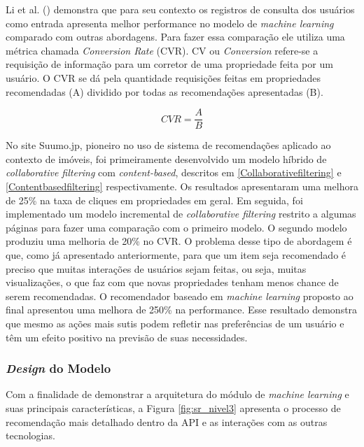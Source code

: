 Li et al. (\citeyear{Summo:2017}) demonstra que para seu contexto os registros de consulta dos usuários como entrada apresenta melhor performance no modelo de \textit{machine learning} comparado com outras abordagens. Para fazer essa comparação ele utiliza uma métrica chamada \textit{Conversion Rate} (CVR). CV ou \textit{Conversion} refere-se a requisição de informação para um corretor de uma propriedade feita por um usuário. O CVR se dá pela quantidade requisições feitas em propriedades recomendadas (A) dividido por todas as recomendações apresentadas (B).

\begin{equation}
    CVR=\frac{A}{B}
\end{equation}

No site Suumo.jp, pioneiro no uso de sistema de recomendações aplicado ao contexto de imóveis, foi primeiramente desenvolvido um modelo híbrido de \textit{collaborative filtering} com \textit{content-based}, descritos em \ref{Collaborativefiltering} e \ref{Contentbasedfiltering} respectivamente. Os resultados apresentaram uma melhora de 25\% na taxa de cliques em propriedades em geral. Em seguida, foi implementado um modelo incremental de \textit{collaborative filtering} restrito a algumas páginas para fazer uma comparação com o primeiro modelo. O segundo modelo produziu uma melhoria de 20\% no CVR. O problema desse tipo de abordagem é que, como já apresentado anteriormente, para que um item seja recomendado é preciso que muitas interações de usuários sejam feitas, ou seja, muitas visualizações, o que faz com que novas propriedades tenham menos chance de serem recomendadas. O recomendador baseado em \textit{machine learning} proposto ao final apresentou uma melhora de 250\% na performance. Esse resultado demonstra que mesmo as ações mais sutis podem refletir nas preferências de um usuário e têm um efeito positivo na previsão de suas necessidades.

\subsubsection{\textit{Design} do Modelo}

Com a finalidade de demonstrar a arquitetura do módulo de \textit{machine learning} e suas principais características, a Figura \ref{fig:sr_nivel3} apresenta o processo de recomendação mais detalhado dentro da API e as interações com as outras tecnologias.

